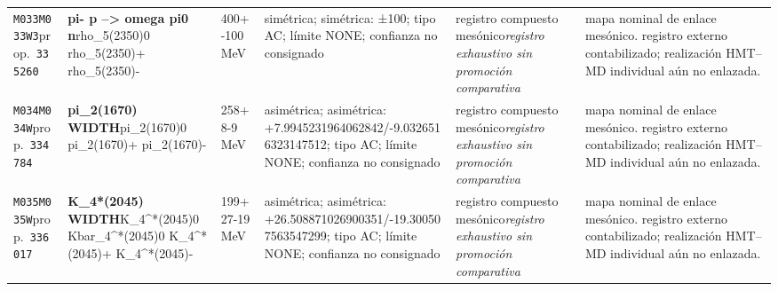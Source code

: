 \begin{landscape}
\begin{longtable}{L{1.85cm}L{4.45cm}L{2.35cm}L{4.05cm}L{3.35cm}L{7.15cm}}
\texttt{M033}\newline \texttt{M033W3}\newline prop.\ \texttt{335260} & \textbf{pi- p --\textgreater{} omega pi0 n}\newline rho\_\allowbreak{}5(2350)0 \textbar{}\allowbreak{} rho\_\allowbreak{}5(2350)+ \textbar{}\allowbreak{} rho\_\allowbreak{}5(2350)- & 400+-100\,MeV & simétrica; simétrica: ±100; tipo AC; límite NONE; confianza no consignado & registro compuesto mesónico\newline \emph{registro exhaustivo sin promoción comparativa} & mapa nominal de enlace mesónico. registro externo contabilizado; realización HMT--MD individual aún no enlazada. \\
\texttt{M034}\newline \texttt{M034W}\newline prop.\ \texttt{334784} & \textbf{pi\_\allowbreak{}2(1670) WIDTH}\newline pi\_\allowbreak{}2(1670)0 \textbar{}\allowbreak{} pi\_\allowbreak{}2(1670)+ \textbar{}\allowbreak{} pi\_\allowbreak{}2(1670)- & 258+8-9\,MeV & asimétrica; asimétrica: +7.9945231964062842/-9.0326516323147512; tipo AC; límite NONE; confianza no consignado & registro compuesto mesónico\newline \emph{registro exhaustivo sin promoción comparativa} & mapa nominal de enlace mesónico. registro externo contabilizado; realización HMT--MD individual aún no enlazada. \\
\texttt{M035}\newline \texttt{M035W}\newline prop.\ \texttt{336017} & \textbf{K\_\allowbreak{}4*(2045) WIDTH}\newline K\_\allowbreak{}4\textasciicircum{}*(2045)0 \textbar{}\allowbreak{} Kbar\_\allowbreak{}4\textasciicircum{}*(2045)0 \textbar{}\allowbreak{} K\_\allowbreak{}4\textasciicircum{}*(2045)+ \textbar{}\allowbreak{} K\_\allowbreak{}4\textasciicircum{}*(2045)- & 199+27-19\,MeV & asimétrica; asimétrica: +26.508871026900351/-19.300507563547299; tipo AC; límite NONE; confianza no consignado & registro compuesto mesónico\newline \emph{registro exhaustivo sin promoción comparativa} & mapa nominal de enlace mesónico. registro externo contabilizado; realización HMT--MD individual aún no enlazada. \\

\end{longtable}
\end{landscape}
